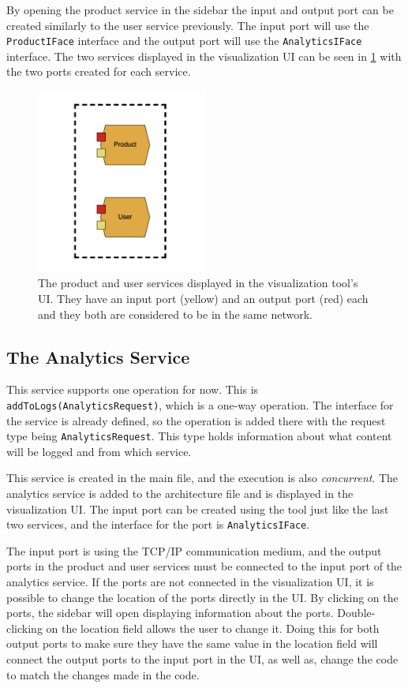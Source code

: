By opening the product service in the sidebar the input and output port can be created similarly to the user service previously. The input port will use the \texttt{ProductIFace} interface and the output port will use the \texttt{AnalyticsIFace} interface.
The two services displayed in the visualization UI can be seen in \cref{figure:jv_product_and_user} with the two ports created for each service.
\begin{figure}[t]
    \center
    \includegraphics[width=0.5\textwidth]{figures/jv_product_and_user.png}
    \caption{The product and user services displayed in the visualization tool's UI. They have an input port (yellow) and an output port (red) each and they both are considered to be in the same network.}
    \label{figure:jv_product_and_user}
\end{figure}

\subsection{The Analytics Service}
This service supports one operation for now. This is \texttt{addToLogs(AnalyticsRequest)}, which is a one-way operation. The interface for the service is already defined, so the operation is added there with the request type being \texttt{AnalyticsRequest}. This type holds information about what content will be logged and from which service.

This service is created in the main file, and the execution is also \textit{concurrent}. The analytics service is added to the architecture file and is displayed in the visualization UI.
The input port can be created using the tool just like the last two services, and the interface for the
port is \texttt{AnalyticsIFace}.

The input port is using the TCP/IP communication medium, and the output ports in the product and user services must be connected to the input port of the analytics service.
If the ports are not connected in the visualization UI, it is possible to change the location of the ports directly in the UI.
By clicking on the ports, the sidebar will open displaying information about the ports. Double-clicking on the location field allows the user to change it.
Doing this for both output ports to make sure they have the same value in the location field will connect the output ports to the input port in the UI, as well as, change the code to match the changes made in the code.

